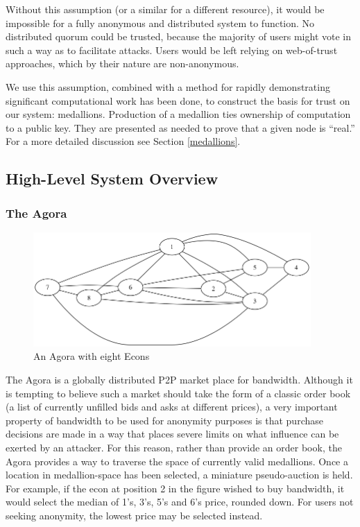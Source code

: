 \documentclass{article}
\begin{document}
Without this assumption (or a similar for a different resource), it would be impossible for a fully anonymous and distributed system to function. No distributed quorum could be trusted, because the majority of users might vote in such a way as to facilitate attacks. Users would be left relying on web-of-trust approaches, which by their nature are non-anonymous.

We use this assumption, combined with a method for rapidly demonstrating significant computational work has been done, to construct the basis for trust on our system: medallions. Production of a medallion ties ownership of computation to a public key. They are presented as needed to prove that a given node is “real.” For a more detailed discussion see Section \ref{medallions}.

\subsection{High-Level System Overview}

\subsubsection{The Agora}

\begin{figure}[htbp]
  \centering
  \includegraphics[width = 300pt]{agoraOverview}
  \caption{An Agora with eight Econs}
\end{figure}

The Agora is a globally distributed P2P market place for bandwidth. Although it is tempting to believe such a market should take the form of a classic order book (a list of currently unfilled bids and asks at different prices), a very important property of bandwidth to be used for anonymity purposes is that purchase decisions are made in a way that places severe limits on what influence can be exerted by an attacker. For this reason, rather than provide an order book, the Agora provides a way to traverse the space of currently valid medallions. Once a location in medallion-space has been selected, a miniature pseudo-auction is held. For example, if the econ at position 2 in the figure wished to buy bandwidth, it would select the median of 1’s, 3’s, 5’s and 6’s price, rounded down. For users not seeking anonymity, the lowest price may be selected instead.
\end{document}
